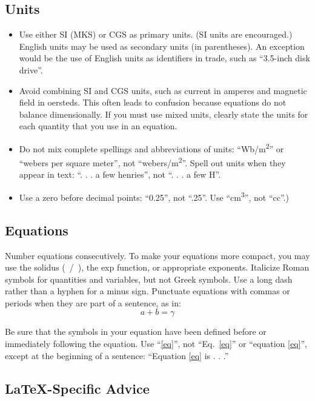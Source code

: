 \documentclass[conference]{IEEEtran}
\begin{document}
\subsection{Units}
\begin{itemize}
\item Use either SI (MKS) or CGS as primary units. (SI units are encouraged.) English units may be used as secondary units (in parentheses). An exception would be the use of English units as identifiers in trade, such as ``3.5-inch disk drive''.
\item Avoid combining SI and CGS units, such as current in amperes and magnetic field in oersteds. This often leads to confusion because equations do not balance dimensionally. If you must use mixed units, clearly state the units for each quantity that you use in an equation.
\item Do not mix complete spellings and abbreviations of units: ``Wb/m\textsuperscript{2}'' or ``webers per square meter'', not ``webers/m\textsuperscript{2}''. Spell out units when they appear in text: ``. . . a few henries'', not ``. . . a few H''.
\item Use a zero before decimal points: ``0.25'', not ``.25''. Use ``cm\textsuperscript{3}'', not ``cc''.)
\end{itemize}

\subsection{Equations}
Number equations consecutively. To make your 
equations more compact, you may use the solidus (~/~), the exp function, or 
appropriate exponents. Italicize Roman symbols for quantities and variables, 
but not Greek symbols. Use a long dash rather than a hyphen for a minus 
sign. Punctuate equations with commas or periods when they are part of a 
sentence, as in:
\begin{equation}
a+b=\gamma\label{eq}
\end{equation}

Be sure that the 
symbols in your equation have been defined before or immediately following 
the equation. Use ``\eqref{eq}'', not ``Eq.~\eqref{eq}'' or ``equation \eqref{eq}'', except at 
the beginning of a sentence: ``Equation \eqref{eq} is . . .''

\subsection{\LaTeX-Specific Advice}
\end{document}
